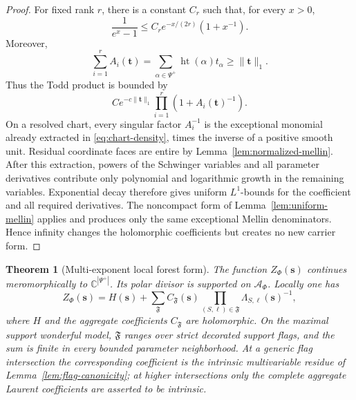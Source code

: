 \documentclass[11pt]{article}
\newtheorem{theorem}{Theorem}[section]
\newcommand{\C}{\mathbb C}
\newcommand{\cA}{\mathcal A}
\begin{document}
\begin{proof}
For fixed rank \(r\), there is a constant \(C_r\) such that, for every
\(x>0\),
\[
 \frac1{e^x-1}\le C_r e^{-x/(2r)}(1+x^{-1}).
\]
Moreover,
\[
 \sum_{i=1}^r A_i(\mathbf t)
 =\sum_{\alpha\in\Psi^+}\operatorname{ht}(\alpha)t_\alpha
 \ge \lVert\mathbf t\rVert_1.
\]
Thus the Todd product is bounded by
\[
 C e^{-c\lVert\mathbf t\rVert_1}
 \prod_{i=1}^r(1+A_i(\mathbf t)^{-1}).
\]
On a resolved chart, every singular factor \(A_i^{-1}\) is the
exceptional monomial already extracted in \eqref{eq:chart-density},
times the inverse of a positive smooth unit.  Residual coordinate faces
are entire by Lemma~\ref{lem:normalized-mellin}.  After this extraction,
powers of the Schwinger variables and all parameter derivatives
contribute only polynomial and logarithmic growth in the remaining
variables.  Exponential decay therefore gives uniform \(L^1\)-bounds
for the coefficient and all required derivatives.  The noncompact form
of Lemma~\ref{lem:uniform-mellin} applies and produces only the same
exceptional Mellin denominators.  Hence infinity changes the
holomorphic coefficients but creates no new carrier form.
\end{proof}

\begin{theorem}[Multi-exponent local forest form]\label{thm:forest}
The function \(Z_\Phi(\mathbf s)\) continues meromorphically to
\(\C^{|\Psi^+|}\).  Its polar divisor is supported on \(\cA_\Phi\).
Locally one has
\begin{equation}\label{eq:forest}
 Z_\Phi(\mathbf s)=H(\mathbf s)+
 \sum_{\mathfrak F}C_{\mathfrak F}(\mathbf s)
 \prod_{(S,\ell)\in\mathfrak F}
 \Lambda_{S,\ell}(\mathbf s)^{-1},
\end{equation}
where \(H\) and the aggregate coefficients \(C_{\mathfrak F}\) are
holomorphic.  On the maximal support wonderful model,
\(\mathfrak F\) ranges over strict decorated support flags, and the sum
is finite in every bounded parameter neighborhood.  At a generic flag intersection the corresponding coefficient is the
intrinsic multivariable residue of Lemma~\ref{lem:flag-canonicity}; at
higher intersections only the complete aggregate Laurent coefficients
are asserted to be intrinsic.
\end{theorem}
\end{document}
